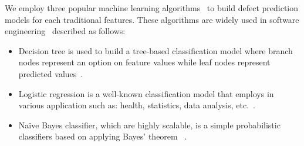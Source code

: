We employ three popular machine learning algorithms~\cite{bishop2006pattern} to build defect prediction models for each traditional features. These algorithms are widely used in software engineering~\cite{wang2016automatically, wang2013using, jing2014dictionary} described as follows: 
\begin{itemize}
	\item Decision tree is used to build a tree-based classification model where branch nodes represent an option on feature values while leaf nodes represent predicted values~\cite{safavian1991survey}.
	\item Logistic regression is a well-known classification model that employs in various application such as: health, statistics, data analysis, etc.~\cite{hosmer2013applied}. 
	\item Na\"{i}ve Bayes classifier, which are highly scalable, is a simple probabilistic classifiers based on applying Bayes' theorem ~\cite{vapnik1998statistical}. 
\end{itemize}

